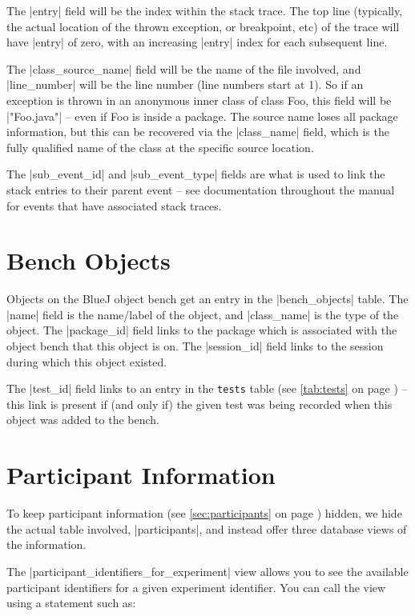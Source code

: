 \documentclass{report}
\newcommand{\myref}[1]{\autoref{#1} on page \pageref*{#1}}
\newcommand{\tabref}[1]{\lstinline|#1| table (see \myref{tab:#1})}
\begin{document}
The |entry| field will be the index within the stack trace.  The top
line (typically, the actual location of the thrown exception, or
breakpoint, etc) of the trace will have |entry| of zero, with an
increasing |entry| index for each subsequent line.

The |class_source_name| field will be the name of the file involved,
and |line_number| will be the line number (line numbers start at 1).
So if an exception is thrown in an anonymous inner class of class Foo,
this field will be |"Foo.java"| -- even if Foo is inside a package.
The source name loses all package information, but this can be
recovered via the |class_name| field, which is the fully qualified
name of the class at the specific source location.

The |sub_event_id| and |sub_event_type| fields are what is used to
link the stack entries to their parent event -- see documentation
throughout the manual for events that have associated stack traces.
\section{Bench Objects}


Objects on the BlueJ object bench get an entry in the |bench_objects|
table.  The |name| field is the name/label of the object, and
|class_name| is the type of the object.  The |package_id| field links
to the package which is associated with the object bench that this
object is on.  The |session_id| field links to the session during
which this object existed.

The |test_id| field links to an entry in the \tabref{tests} -- this
link is present if (and only if) the given test was being recorded
when this object was added to the bench.

\section{Participant Information}
\label{sec:views}

To keep participant information (see \myref{sec:participants}) hidden,
we hide the actual table involved, |participants|, and instead offer three
database views of the information.


The |participant_identifiers_for_experiment| view allows you to see the
available participant identifiers for a given experiment identifier.  You can
call the view using a statement such as:
\end{document}
